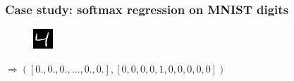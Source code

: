 \documentclass[mathserif, xcolor=dvipsnames]{beamer}
\begin{document}
\begin{frame}[t]
    \frametitle{Case study: softmax regression on MNIST digits}

    \begin{center}
    \begin{minipage}{0.05\textwidth}
    \begin{figure}[H]
        \raggedleft
        \includegraphics[width=\textwidth]{mnist_4.png}
    \end{figure}
    \end{minipage}
    \begin{minipage}{0.9\textwidth}
        \raggedright
        $\Rightarrow ([0., 0., 0., \ldots, 0., 0.],
                      [0, 0, 0, 0, 1, 0, 0, 0, 0, 0])$
    \end{minipage}
    \end{center}


\end{frame}
\end{document}
